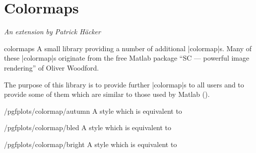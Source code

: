 \section{Colormaps}

{\emph{An extension by Patrick H\"acker}}


\begin{pgfplotslibrary}{colormaps}
	A small library providing a number of additional |colormap|s. Many of these |colormap|s originate from the free Matlab package ``SC --- powerful image rendering'' of Oliver Woodford.
	
	The purpose of this library is to provide further |colormap|s to all users and to provide some of them which are similar to those used by Matlab (\textregistered).

\begin{stylekey}{/pgfplots/colormap/autumn}
	A style which is equivalent to 
\begin{codeexample}
\end{codeexample}


	\matlabcolormaptext
\end{stylekey}

\begin{stylekey}{/pgfplots/colormap/bled}
	A style which is equivalent to 
\begin{codeexample}
\end{codeexample}


	\matlabcolormaptext
\end{stylekey}

\begin{stylekey}{/pgfplots/colormap/bright}
	A style which is equivalent to 
\begin{codeexample}
\end{codeexample}


	\matlabcolormaptext
\end{stylekey}


\end{pgfplotslibrary}
